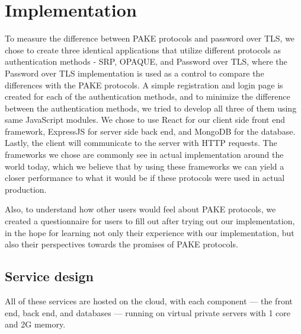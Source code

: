 \section{Implementation}
\label{sec:implementation}

To measure the difference between PAKE protocols and password over TLS, we chose to create three identical applications that utilize different protocols as authentication methods - SRP, OPAQUE, and Password over TLS, where the Password over TLS implementation is used as a control to compare the differences with the PAKE protocols.
A simple registration and login page is created for each of the authentication methods, and to minimize the difference between the authentication methods, we tried to develop all three of them using same JavaScript modules. 
We chose to use React for our client side front end framework, ExpressJS for server side back end, and MongoDB for the database.
Lastly, the client will communicate to the server with HTTP requests.
The frameworks we chose are commonly see in actual implementation around the world today, which we believe that by using these frameworks we can yield a closer performance to what it would be if these protocols were used in actual production.


Also, to understand how other users would feel about PAKE protocols, we created a questionnaire for users to fill out after trying out our implementation, in the hope for learning not only their experience with our implementation, but also their perspectives towards the promises of PAKE protocols.





\subsection{Service design}
All of these services are hosted on the cloud, with each component — the front end, back end, and databases — running on virtual private servers with 1 core and 2G memory.

